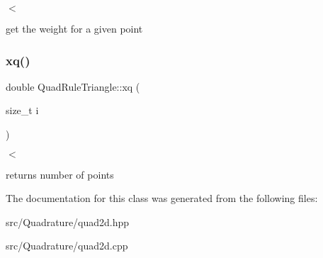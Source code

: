 $<$ 

get the weight for a given point \mbox{\label{classHArDCore2D_1_1QuadRuleTriangle_a98156eda410a5aa6f9787ce920358fca}} 
\subsubsection{\texorpdfstring{xq()}{xq()}}
{\footnotesize\ttfamily double Quad\+Rule\+Triangle\+::xq (\begin{DoxyParamCaption}\item[{size\+\_\+t}]{i }\end{DoxyParamCaption})}



$<$ 

returns number of points 

The documentation for this class was generated from the following files\+:\begin{DoxyCompactItemize}
\item 
src/\+Quadrature/quad2d.\+hpp\item 
src/\+Quadrature/quad2d.\+cpp\end{DoxyCompactItemize}
